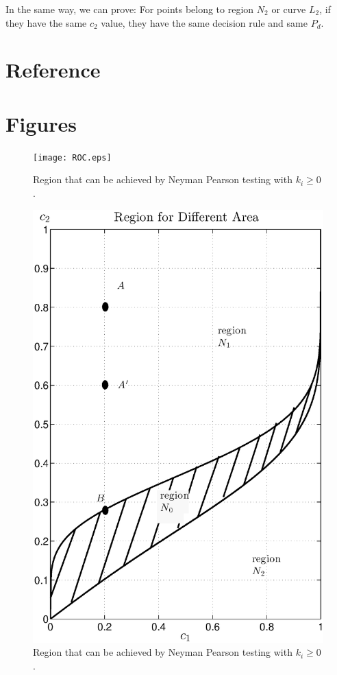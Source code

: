 \documentclass[12pt,journal,a4paper,twoside,onecolumn]{IEEEtran}
\begin{document}
\begin{spacing}{2.5}
In the same way, we can prove: For points belong to region $N_2$ or curve $L_2$, if they have the same $c_2$ value, they have the same decision rule and same $P_d$.

\section{Reference}
\newpage

\section{Figures}
\newpage

\begin{figure}[!t]
\centering
\texttt{[image: ROC.eps]}
\caption{Region that can be achieved by Neyman Pearson testing with $k_i \geq 0$.}
\label{pic: surface for m0 gaussian}
\end{figure}
\newpage
\begin{figure}[!t]
\centering
\includegraphics[width=12cm]{region.eps}
\caption{Region that can be achieved by Neyman Pearson testing with $k_i \geq 0$.}
\label{pic: contour for m0 gaussian}
\end{figure}


\end{spacing}
\end{document}
